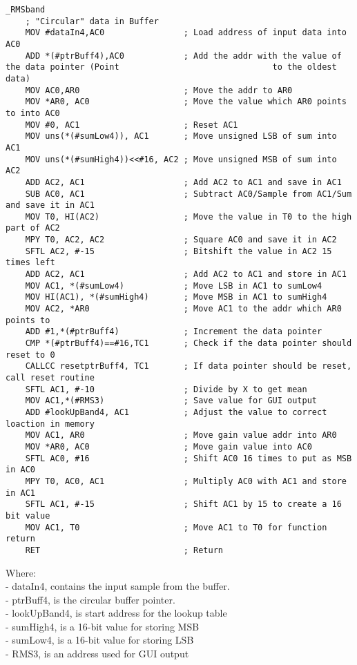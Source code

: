 \begin{lstlisting}[language={[x86masm]Assembler}, caption = {limiter Algorithm},label={listingCompressorMain}]
_RMSband
	; "Circular" data in Buffer
	MOV #dataIn4,AC0				; Load address of input data into AC0
	ADD *(#ptrBuff4),AC0			; Add the addr with the value of the data pointer (Point 					 	       to the oldest data)
	MOV AC0,AR0						; Move the addr to AR0
	MOV *AR0, AC0					; Move the value which AR0 points to into AC0
	MOV #0, AC1						; Reset AC1
	MOV uns(*(#sumLow4)), AC1       ; Move unsigned LSB of sum into AC1
	MOV uns(*(#sumHigh4))<<#16, AC2 ; Move unsigned MSB of sum into AC2
	ADD AC2, AC1					; Add AC2 to AC1 and save in AC1
	SUB AC0, AC1					; Subtract AC0/Sample from AC1/Sum and save it in AC1	 
	MOV T0, HI(AC2)					; Move the value in T0 to the high part of AC2
	MPY T0, AC2, AC2				; Square AC0 and save it in AC2
	SFTL AC2, #-15					; Bitshift the value in AC2 15 times left 
	ADD AC2, AC1					; Add AC2 to AC1 and store in AC1
	MOV AC1, *(#sumLow4)			; Move LSB in AC1 to sumLow4
	MOV HI(AC1), *(#sumHigh4)		; Move MSB in AC1 to sumHigh4
	MOV AC2, *AR0					; Move AC1 to the addr which AR0 points to
	ADD #1,*(#ptrBuff4)				; Increment the data pointer
	CMP *(#ptrBuff4)==#16,TC1		; Check if the data pointer should reset to 0
	CALLCC resetptrBuff4, TC1		; If data pointer should be reset, call reset routine
	SFTL AC1, #-10					; Divide by X to get mean
	MOV AC1,*(#RMS3)				; Save value for GUI output
	ADD #lookUpBand4, AC1			; Adjust the value to correct loaction in memory
	MOV AC1, AR0					; Move gain value addr into AR0
	MOV *AR0, AC0					; Move gain value into AC0
	SFTL AC0, #16					; Shift AC0 16 times to put as MSB in AC0
	MPY T0, AC0, AC1				; Multiply AC0 with AC1 and store in AC1 
	SFTL AC1, #-15					; Shift AC1 by 15 to create a 16 bit value
	MOV AC1, T0						; Move AC1 to T0 for function return
	RET								; Return
\end{lstlisting}

Where: \\
- dataIn4, contains the input sample from the buffer. \\
- ptrBuff4, is the circular buffer pointer. \\
- lookUpBand4, is start address for the lookup table\\
- sumHigh4, is a 16-bit value for storing MSB \\
- sumLow4, is a 16-bit value for storing LSB \\
- RMS3, is an address used for GUI output \\

